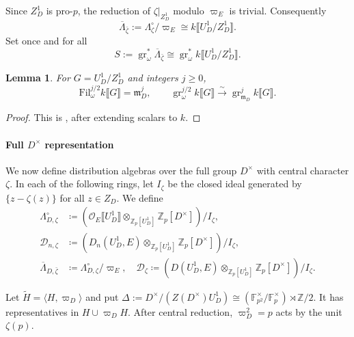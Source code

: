 \documentclass[11pt]{article}
\newtheorem{lemma}[theorem]{Lemma}
\theoremstyle{definition}
\newcommand{\cO}{\mathcal O}
\newcommand{\mD}{\mathfrak m_D}
\newcommand{\gr}{\operatorname{gr}}
\begin{document}
Since $Z_D^1$ is pro-$p$, the reduction of $\zeta|_{Z_D^1}$ modulo $\varpi_E$ is
trivial.  Consequently
\[
 \overline{\Lambda}_{\bar\zeta}:=\Lambda_\zeta^\circ/\varpi_E
 \cong k\llbracket U_D^1/Z_D^1\rrbracket.
\]
Set once and for all
\[
 S:=\gr_{\omega}^*\overline{\Lambda}_{\bar\zeta}
 \cong\gr_{\omega}^*k\llbracket U_D^1/Z_D^1\rrbracket.
\]

\begin{lemma}\label{omega=m-adic}
For $G=U_D^1/Z_D^1$ and integers $j\geq0$,
\[
 \mathrm{Fil}_\omega^{j/2}k\llbracket G\rrbracket=\mD^j,
 \qquad
 \gr_\omega^{j/2}k\llbracket G\rrbracket
       \xrightarrow{\sim}\gr_{\mD}^jk\llbracket G\rrbracket.
\]
\end{lemma}
\begin{proof}
This is \cite[Lemma~2.4]{HuWangModP}, after extending scalars to $k$.
\end{proof}

\paragraph{Full $D^\times$ representation}
We now define distribution algebras over the full group $D^\times$ with central character $\zeta$.
In each of the following rings, let $I_\zeta$ be the closed ideal generated by $\{z-\zeta(z)\}$ for all $z\in Z_D$. We define
\begin{align*}
 \Lambda_{D,\zeta}^\circ
 &\coloneqq(\cO_E\llbracket U_D^1\rrbracket\otimes_{\mathbb{Z}_p[U_D^1]}\mathbb{Z}_p[D^\times])/I_\zeta,\\
 \mathscr D_{n,\zeta}
 &\coloneqq(D_n(U_D^1,E)\otimes_{\mathbb{Z}_p[U_D^1]}\mathbb{Z}_p[D^\times])/I_\zeta,\\
 \overline{\Lambda}_{D,\bar\zeta}
 &\coloneqq\Lambda_{D,\zeta}^\circ/\varpi_E, \quad \mathscr{D}_\zeta\coloneqq(D(U_D^1,E)\otimes_{\mathbb{Z}_p[U_D^1]}\mathbb{Z}_p[D^\times])/I_\zeta.
\end{align*}

Let $\widetilde H=\langle H,\varpi_D\rangle$ and put $\Delta:=D^\times/(Z(D^\times)U_D^1)\cong (\mathbb{F}_{p^2}^\times/\mathbb{F}_p^\times)\rtimes\mathbb{Z}/2$. It has representatives
in $H\cup\varpi_DH$.  After central reduction, $\varpi_D^2=p$ acts by
the unit $\zeta(p)$. 
\end{document}
